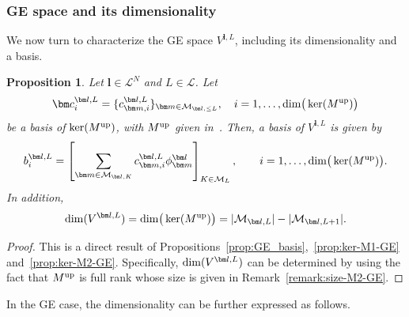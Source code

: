 \documentclass{article}
\newcommand{\card}[1]{|{#1}|}
\newcommand{\dimge}[2]{\dim(V^{#1,#2})}
\newtheorem{proposition}[theorem]{Proposition}
\numberwithin{equation}{section}
\def\bc{{\bm c}}
\def\bl{{\bm l}}
\def\bbm{{\bm m}}
\def\calM{\mathcal{M}}
\def\calL{\mathcal{L}}
\def\MlL{{M}}
\def\dim{{{\rm dim}}}
\def\Mup{{\MlL}^{\textup{up}}}
\begin{document}
\subsubsection{GE space and its dimensionality}

We now turn to characterize the GE space $V^{\bl,L}$, including its dimensionality and a basis. 

\begin{proposition}\label{prop:ge-su2}
Let $\bl\in\calL^N$ and $L \in \calL$. Let
\[
    \bc^{\bl,L}_i = \{c_{\bbm,i}^{\bl,L}\}_{\bbm\in\calM_{\bl,\le L}},\quad i=1,\ldots,\dim\big(\ker(\Mup)\big)
\]
be a basis of $\ker(\Mup)$, with $\Mup$ given in~.
Then, a basis of $V^{\bl,L}$ is given by 
\begin{equation}\label{eq:GE-basis-su2}
     b^{\bl,L}_i = 
    \left[
        \sum_{\bbm \in \calM_{\bl,K}}c_{\bbm,i}^{\bl,L}\phi^\bl_\bbm
    \right]_{K\in\calM_L},\qquad i=1,\ldots,\dim\big(\ker(\Mup)\big).
\end{equation}
In addition, 
\begin{equation}\label{eq:dim_su2}
    \dimge{\bl}{L}=\dim\big(\ker(\Mup)\big)=\card{\calM_{\bl,L}} - \card{\calM_{\bl,L+1}}.
\end{equation}
\end{proposition}
\begin{proof}
This is a direct result of Propositions~\ref{prop:GE_basis},~\ref{prop:ker-M1-GE} and~\ref{prop:ker-M2-GE}. Specifically, $\dimge{\bl}{L}$ can be determined by using the fact that $\Mup$ is full rank whose size is given in Remark~\ref{remark:size-M2-GE}.
\end{proof}

In the GE case, 
the dimensionality can be further expressed as follows.
\end{document}
